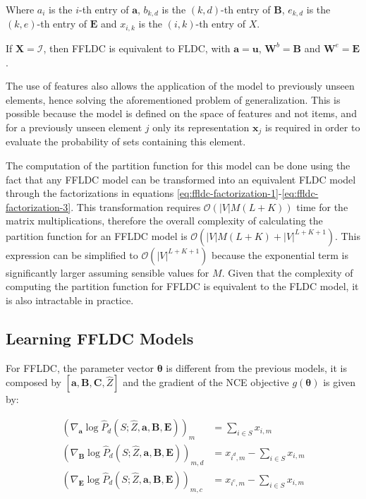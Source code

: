 Where $a_{i}$ is the $i$-th entry of $\mathbf{a}$, $b_{k,d}$ is the $(k,d)$-th entry of $\mathbf{B}$, $e_{k,d}$ is the $(k,e)$-th entry of $\mathbf{E}$ and $x_{i,k}$ is the $(i,k)$-th entry of $X$.

\begin{remark}
  If $\mathbf{X} = \mathcal{I}$, then FFLDC is equivalent to FLDC, with $\mathbf{a} = \mathbf{u}$, $\mathbf{W}^{b} = \mathbf{B}$ and $\mathbf{W}^{e} = \mathbf{E}$.
\end{remark}

The use of features also allows the application of the model to previously unseen elements, hence solving the aforementioned problem of generalization. This is possible because the model is defined on the space of features and not items, and for a previously unseen element $j$ only its representation $\mathbf{x}_{j}$ is required in order to evaluate the probability of sets containing this element.

The computation of the partition function for this model can be done using the fact that any FFLDC model can be transformed into an equivalent FLDC model through the factorizations in equations \eqref{eq:ffldc-factorization-1}-\eqref{eq:ffldc-factorization-3}. This transformation requires $\mathcal{O}(|V|M(L+K))$ time for the matrix multiplications, therefore the overall complexity of calculating the partition function for an FFLDC model is $\mathcal{O}(|V|M(L+K) + |V|^{L+K+1})$. This expression can be simplified to $\mathcal{O}(|V|^{L+K+1})$ because the exponential term is significantly larger assuming sensible values for $M$. Given that the complexity of computing the partition function for FFLDC is equivalent to the FLDC model, it is also intractable in practice.

\subsection{Learning FFLDC Models}

For FFLDC, the parameter vector $\boldsymbol{\theta}$ is different from the previous models, it is composed by $[\mathbf{a}, \mathbf{B}, \mathbf{C}, \hat{Z}]$ and the gradient of the NCE objective $g(\boldsymbol{\theta})$ is given by:

\begin{align}
  \left(\nabla_{\mathbf{a}}\log{\hat{P}_{d}(S; \hat{Z}, \mathbf{a}, \mathbf{B}, \mathbf{E})}\right)_{m} &= \sum_{i \in S} x_{i,m} \label{eq:sub-a}\\
  \left(\nabla_{\mathbf{B}}\log{\hat{P}_{d}(S; \hat{Z}, \mathbf{a}, \mathbf{B}, \mathbf{E})}\right)_{m,d} &= x_{i^{d},m} - \sum_{i \in S} x_{i,m} \label{eq:sub-b} \\
  \left(\nabla_{\mathbf{E}}\log{\hat{P}_{d}(S; \hat{Z}, \mathbf{a}, \mathbf{B}, \mathbf{E})}\right)_{m,c} &= x_{i^{c},m} - \sum_{i \in S} x_{i,m} \label{eq:sub-e}
\end{align}


